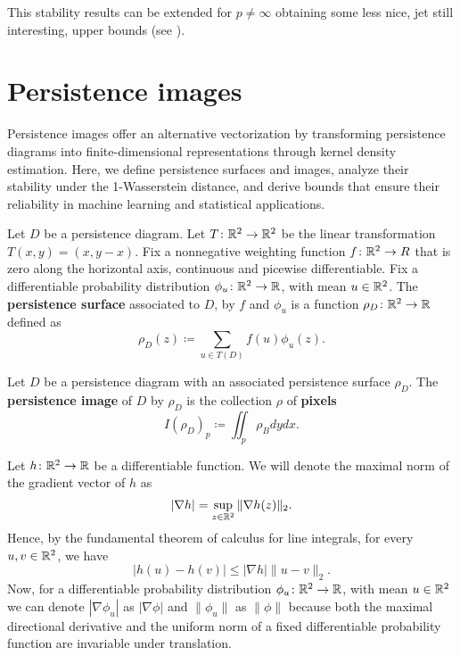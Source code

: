 This stability results can be extended for $ p \neq \infty $ obtaining some less nice, jet still interesting, upper bounds (see \cite{bubenik}).

\section{Persistence images} \label{sec:images}

Persistence images offer an alternative vectorization by transforming persistence diagrams into finite-dimensional representations through kernel density estimation. Here, we define persistence surfaces and images, analyze their stability under the 1-Wasserstein distance, and derive bounds that ensure their reliability in machine learning and statistical applications.

\begin{definition}
    Let $ D $ be a persistence diagram. Let $ T \colon \mathbb R^2 \to \mathbb R^2 $ be the linear transformation $ T(x, y) = (x, y-x) $. Fix a nonnegative weighting function $ f \colon \mathbb R^2 \to R $ that is zero along the horizontal axis, continuous and picewise differentiable. Fix a differentiable probability distribution $ \phi_u \colon \mathbb R^2 \to \mathbb R $, with mean $ u \in \mathbb R^2 $. The {\bf persistence surface} associated to $ D $, by $ f $ and $ \phi_u $ is a function $ \rho_D \colon \mathbb R^2 \to \mathbb R $ defined as
    \begin{equation}
        \rho_D(z) \coloneq \sum_{u \in T(D)} f(u) \phi_u(z).
    \end{equation}
\end{definition}

\begin{definition}
    Let $ D $ be a persistence diagram with an associated persistence surface $ \rho_D $. The {\bf persistence image} of $ D $ by $ \rho_D $ is the collection $ \rho $ of {\bf pixels}
    \begin{equation}
        I(\rho_D)_p \coloneq \iint_p \rho_B dy dx.
    \end{equation}
\end{definition}

Let $ h \colon \mathbb R^2 \to \mathbb R $ be a differentiable function. We will denote the maximal norm of the gradient vector of $ h $ as
\begin{equation}
    |\nabla h | = \sup_{z \in \mathbb R^2} \| \nabla h(z) \|_2.
\end{equation}
Hence, by the fundamental theorem of calculus for line integrals, for every $ u, v \in \mathbb R^2 $, we have
\begin{equation}
    |h(u) - h(v)| \leq |\nabla h| \|u-v\|_2.
\end{equation}
Now, for a differentiable probability distribution $ \phi_u \colon \mathbb R^2 \to \mathbb R $, with mean $ u \in \mathbb R^2 $ we can denote $ |\nabla \phi_u| $ as $ |\nabla \phi| $ and $ \|\phi_u\| $ as $ \|\phi\| $ because both the maximal directional derivative and the uniform norm of a fixed differentiable probability function are invariable under translation.

